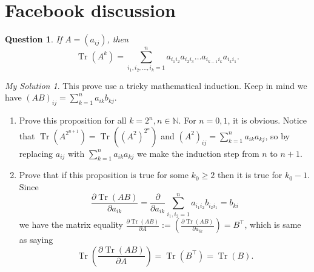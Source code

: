 \documentclass[]{article}
\newtheorem{prop}{Question}
\theoremstyle{remark}
\newtheorem*{sol}{My Solution}
\begin{document}
\section{Facebook discussion}
\begin{prop}
	 If $ A= (a_{ij}) $, then \[ \operatorname{Tr}\left(A^{k}\right)=\sum_{i_{1}, i_{2}, \ldots, i_{k}=1}^{n} a_{i_{1} i_{2}} a_{i_{2} i_{3}} \ldots a_{i_{k-1} i_{k}} a_{i_{k} i_{1}}. \]
\end{prop}
\begin{sol}
	This prove use a tricky mathematical induction. Keep in mind we have $ (AB)_{ij} =\sum_{k=1}^{n} a_{i k} b_{k j} $.
	\begin{enumerate}
		\item Prove this proposition for all $ k=2^n, n\in \mathbb{N} $. For $ n=0,1 $, it is obvious. Notice that $ \operatorname{Tr}\left(A^{2^{n+1}}\right) = \operatorname{Tr}\left((A^2)^{2^n}\right) $ and  $\left(A^{2}\right)_{i j}=\sum_{k=1}^{n} a_{i k} a_{k j}$, so by replacing $ a_{ij} $ with $ \sum_{k=1}^{n} a_{i k} a_{k j} $ we make the induction step from $ n $ to $ n+1 $.
		\item Prove that if this proposition is true for some $ k_0 \ge 2 $ then it is true for $ k_0 -1 $. Since
		\[ \frac{\partial\operatorname{Tr}(AB)}{\partial a_{ik} } =\frac{\partial}{\partial a_{ik}}\sum_{i_1,i_2=1}^{n}a_{i_1 i_2} b_{i_2 i_1}  = b_{ki} \]
		we have the matrix equality $ \frac{\partial\operatorname{Tr}(AB)}{\partial A } :=( \frac{\partial\operatorname{Tr}(AB)}{\partial a_{ik} }) = B^\intercal$, which is same as saying
		\[ \operatorname{Tr}\left( \frac{\partial\operatorname{Tr}(AB)}{\partial A } \right) =\operatorname{Tr}(B^\intercal)=\operatorname{Tr}(B).
		\]


\end{enumerate}
\end{sol}
\end{document}
